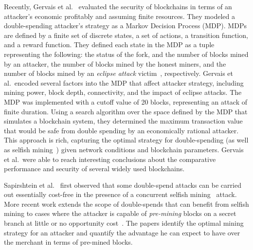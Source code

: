 Recently, Gervais et al.~\cite{Gervais:2016} evaluated the security of blockchains in terms of an attacker's economic profitably and assuming finite resources. They modeled a double-spending attacker's strategy  as a Markov Decision Process (MDP). MDPs are defined by a finite set of discrete states, a set of actions, a transition function, and a reward function. They defined each  state in the MDP as a tuple representing the following: the status of the fork, and the number of blocks mined by an attacker,  the number of blocks mined by the honest miners, and  the number of blocks mined by an {\em eclipse attack} victim~\cite{Heilman:2015}, respectively.   Gervais et al.\ encoded several factors into the MDP that affect  attacker strategy, including mining power, block depth, connectivity, and the impact of eclipse attacks. The MDP was implemented with a cutoff value of 20 blocks, representing an attack of finite duration. Using a search algorithm over the space defined by the MDP that simulates a blockchain system, they determined the maximum transaction value that would be safe from double spending by an economically rational attacker. This  approach is rich, capturing the optimal strategy for  double-spending (as well as selfish mining~\cite{eyal:2014,sapirshtein:2015}) given  network conditions and blockchain parameters.  Gervais et al.\ were able to reach interesting conclusions about the comparative performance and security of several widely used blockchains.

Sapirshtein et al.~\cite{sapirshtein:2015} first observed that some double-spend attacks can be carried out essentially cost-free in the presence of a concurrent selfish mining~\cite{eyal:2014} attack. 
More recent work extends the scope of double-spends that can benefit from selfish mining to cases where the attacker is capable of \emph{pre-mining} blocks on a secret branch at little or no opportunity cost~\cite{Sompolinsky:2016}. The papers identify the optimal mining strategy for an attacker and quantify the advantage he can expect to have over the merchant in terms of pre-mined blocks.

